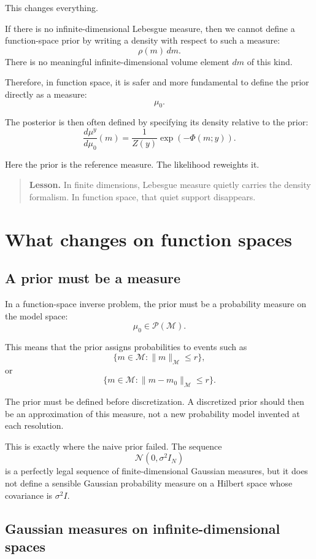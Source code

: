 \documentclass[11pt,a4paper]{book}
\newenvironment{lesson}
  {\begin{quote}\textbf{Lesson.}}
  {\end{quote}}
\newcommand{\M}{\mathcal{M}}      %
\newcommand{\prior}{\mu_0}
\newcommand{\post}{\mu^y}
\newcommand{\obs}{y}
\begin{document}
This changes everything.

If there is no infinite-dimensional Lebesgue measure, then we cannot define a
function-space prior by writing a density with respect to such a measure:
\[
    \rho(m)\,dm.
\]
There is no meaningful infinite-dimensional volume element $dm$ of this kind.

Therefore, in function space, it is safer and more fundamental to define the
prior directly as a measure:
\[
    \prior.
\]

The posterior is then often defined by specifying its density relative to the
prior:
\[
    \frac{d\post}{d\prior}(m)
    =
    \frac{1}{Z(\obs)}
    \exp(-\Phi(m;\obs)).
\]

Here the prior is the reference measure. The likelihood reweights it.

\begin{lesson}
In finite dimensions, Lebesgue measure quietly carries the density formalism.
In function space, that quiet support disappears.
\end{lesson}

\section{What changes on function spaces}

\subsection{A prior must be a measure}

In a function-space inverse problem, the prior must be a probability measure on
the model space:
\[
    \prior \in \mathcal{P}(\M).
\]

This means that the prior assigns probabilities to events such as
\[
    \{m\in\M : \|m\|_{\M}\leq r\},
\]
or
\[
    \{m\in\M : \|m-m_0\|_{\M}\leq r\}.
\]

The prior must be defined before discretization. A discretized prior should then
be an approximation of this measure, not a new probability model invented at
each resolution.

This is exactly where the naive prior failed. The sequence
\[
    \mathcal{N}(0,\sigma^2 I_N)
\]
is a perfectly legal sequence of finite-dimensional Gaussian measures, but it
does not define a sensible Gaussian probability measure on a Hilbert space
whose covariance is $\sigma^2 I$.

\subsection{Gaussian measures on infinite-dimensional spaces}
\end{document}
